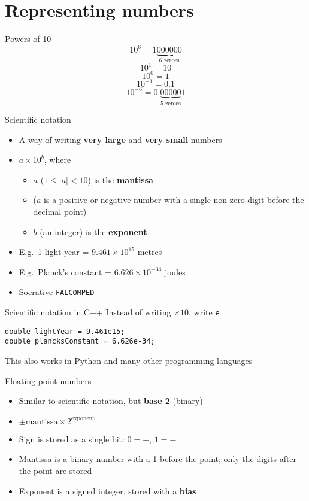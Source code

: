 \part{Representing numbers}
\frame{\partpage}

\begin{frame}{Powers of 10}
	\pause
	$$ 10^6 = 1\underbrace{000000}_{\text{6 zeroes}} $$
	\pause
	$$ 10^1 = 10 $$
	\pause
	$$ 10^0 = 1 $$
	\pause
	$$ 10^{-1} = 0.1 $$
	\pause
	$$ 10^{-6} = 0.\underbrace{00000}_{\text{5 zeroes}}1 $$
\end{frame}

\begin{frame}{Scientific notation}
	\begin{itemize}
		\pause\item A way of writing \textbf{very large} and \textbf{very small} numbers
		\pause\item $a \times 10^b$, where
			\begin{itemize}
				\pause\item $a$ ($1 \leq |a| < 10$) is the \textbf{mantissa}
				\pause\item ($a$ is a positive or negative number
					with a single non-zero digit before the decimal point)
				\pause\item $b$ (an integer) is the \textbf{exponent}
			\end{itemize}
		\pause\item E.g.\ 1 light year = $9.461 \times 10^{15}$ metres
		\pause\item E.g.\ Planck's constant = $6.626 \times 10^{-34}$ joules
		\pause\item Socrative \texttt{FALCOMPED}
	\end{itemize}
\end{frame}

\begin{frame}[fragile]{Scientific notation in C++}
	\pause Instead of writing $\times 10$, write \lstinline{e}
	\pause
	\begin{lstlisting}
double lightYear = 9.461e15;
double plancksConstant = 6.626e-34;
	\end{lstlisting}
	\pause This also works in Python and many other programming languages
\end{frame}

\begin{frame}{Floating point numbers}
	\begin{itemize}
		\pause\item Similar to scientific notation, but \textbf{base 2} (binary)
		\pause\item $\pm \text{mantissa} \times 2^{\text{exponent}}$
		\pause\item Sign is stored as a single bit: $0=+$, $1=-$
		\pause\item Mantissa is a binary number with a 1 before the point;
			only the digits after the point are stored
		\pause\item Exponent is a signed integer, stored with a \textbf{bias}
	\end{itemize}
\end{frame}

